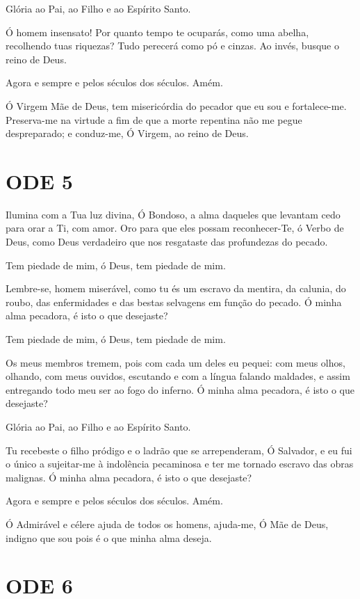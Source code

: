 \documentclass{subfiles}
\begin{document}
Glória ao Pai, ao Filho e ao Espírito Santo.

Ó homem insensato! Por quanto tempo te ocuparás, como uma abelha, recolhendo
tuas riquezas? Tudo perecerá como pó e cinzas. Ao invés, busque o reino de Deus.

Agora e sempre e pelos séculos dos séculos. Amém.

\theotokion{}Ó Virgem Mãe de Deus, tem misericórdia do pecador que eu sou
e fortalece-me. Preserva-me na virtude a fim de que a morte repentina não
me pegue despreparado; e conduz-me, Ó Virgem, ao reino de Deus.

\section*{ODE 5}

\eirmos{}Ilumina com a Tua luz divina, Ó Bondoso, a alma daqueles que levantam
cedo para orar a Ti, com amor. Oro para que eles possam reconhecer-Te, ó
Verbo de Deus, como Deus verdadeiro que nos resgataste das profundezas do
pecado.

Tem piedade de mim, ó Deus, tem piedade de mim.

Lembre-se, homem miserável, como tu és um escravo da mentira, da
calunia, do roubo, das enfermidades e das bestas selvagens em função do
pecado. Ó minha alma pecadora, é isto o que desejaste?

Tem piedade de mim, ó Deus, tem piedade de mim.

Os meus membros tremem, pois com cada um deles eu pequei: com
meus olhos, olhando, com meus ouvidos, escutando e com a língua falando
maldades, e assim entregando todo meu ser ao fogo do inferno. Ó minha alma
pecadora, é isto o que desejaste?

Glória ao Pai, ao Filho e ao Espírito Santo.

Tu recebeste o filho pródigo e o ladrão que se arrependeram, Ó
Salvador, e eu fui o único a sujeitar-me à indolência pecaminosa e ter me
tornado escravo das obras malignas. Ó minha alma pecadora, é isto o que
desejaste?

Agora e sempre e pelos séculos dos séculos. Amém.

Ó Admirável e célere ajuda de todos os homens, ajuda-me, Ó Mãe de
Deus, indigno que sou pois é o que minha alma deseja.

\section*{ODE 6}
\end{document}
